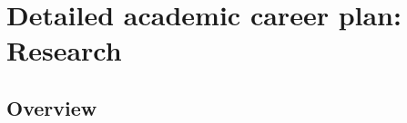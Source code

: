 \chapter{Detailed academic career plan: Research}
\label{goals}

\vspace{-10mm}


\section{Overview}

